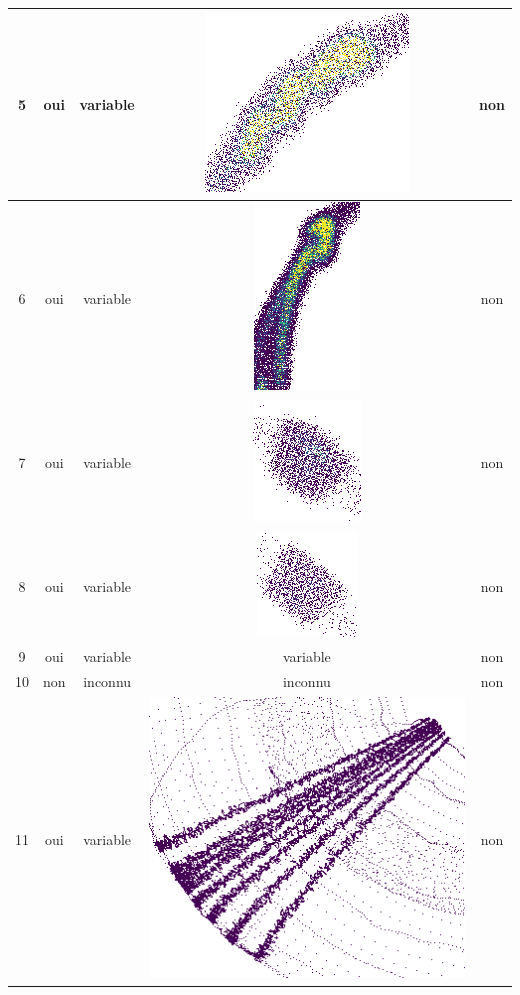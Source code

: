 \begin{table}[h]
\begin{tabular}{|c|c|c|c|c|}
\hline
5 & oui & variable & \includegraphics[scale=0.2]{images/set5.png} & non \\
\hline
6 & oui & variable & \includegraphics[scale=0.2]{images/set6.png} & non \\
\hline
7 & oui & variable & \includegraphics[scale=0.2]{images/set7.png} & non \\
\hline
8 & oui & variable & \includegraphics[scale=0.2]{images/set8.png} & non \\
\hline
9 & oui & variable & variable & non \\
\hline
10 & non & inconnu & inconnu  & non \\
\hline
11 & oui & variable & \includegraphics[scale=0.2]{images/set11.png}  & non \\

\end{tabular}
\end{table}
